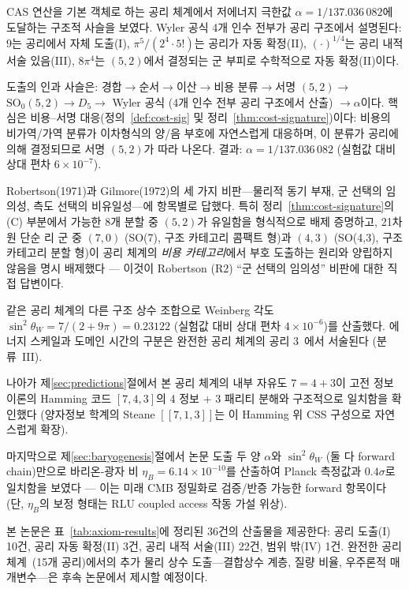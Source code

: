 \documentclass[entropy,article,submit,pdftex,oneauthor]{Definitions/mdpi}
\begin{document}
CAS 연산을 기본 객체로 하는 공리 체계에서 저에너지 극한값 $\alpha = 1/137.036\,082$에 도달하는 구조적 사슬을 보였다. Wyler 공식 4개 인수 전부가 공리 구조에서 설명된다: $9$는 공리에서 자체 도출(I), $\pi^5/(2^4 \cdot 5!)$는 공리가 자동 확정(II), $(\cdot)^{1/4}$는 공리 내적 서술 있음(III), $8\pi^4$는 $(5,2)$에서 결정되는 군 부피로 수학적으로 자동 확정(II)이다.

도출의 인과 사슬은: 경합$\to$순서$\to$이산$\to$비용 분류$\to$서명 $(5,2)$$\to$$\mathrm{SO}_0(5,2) \to D_5 \to$ Wyler 공식 (4개 인수 전부 공리 구조에서 산출) $\to \alpha$이다. 핵심은 비용--서명 대응(정의~\ref{def:cost-sig} 및 정리~\ref{thm:cost-signature})이다: 비용의 비가역/가역 분류가 이차형식의 양/음 부호에 자연스럽게 대응하며, 이 분류가 공리에 의해 결정되므로 서명 $(5,2)$가 따라 나온다. 결과: $\alpha = 1/137.036\,082$ (실험값 대비 상대 편차 $6 \times 10^{-7}$).

Robertson(1971)과 Gilmore(1972)의 세 가지 비판---물리적 동기 부재, 군 선택의 임의성, 측도 선택의 비유일성---에 항목별로 답했다. 특히 정리~\ref{thm:cost-signature}의 (C) 부분에서 가능한 8개 분할 중 $(5,2)$가 유일함을 형식적으로 배제 증명하고, 21차원 단순 리 군 중 $(7,0)$ (SO(7), 구조 카테고리 콤팩트 형)과 $(4,3)$ (SO(4,3), 구조 카테고리 분할 형)이 공리 체계의 \emph{비용 카테고리}에서 부호 도출하는 원리와 양립하지 않음을 명시 배제했다 — 이것이 Robertson (R2) ``군 선택의 임의성'' 비판에 대한 직접 답변이다.

같은 공리 체계의 다른 구조 상수 조합으로 Weinberg 각도 $\sin^2\theta_W = 7/(2+9\pi) = 0.23122$ (실험값 대비 상대 편차 $4 \times 10^{-6}$)를 산출했다. 에너지 스케일과 도메인 시간의 구분은 완전한 공리 체계의 공리 3~\cite{han2026}에서 서술된다 (분류~III).

나아가 제\ref{sec:predictions}절에서 본 공리 체계의 내부 자유도 $7 = 4 + 3$이 고전 정보이론의 Hamming 코드 $[7,4,3]$의 4 정보 + 3 패리티 분해와 구조적으로 일치함을 확인했다 (양자정보 학계의 Steane $[[7,1,3]]$는 이 Hamming 위 CSS 구성으로 자연스럽게 확장).

마지막으로 제\ref{sec:baryogenesis}절에서 논문 도출 두 양 $\alpha$와 $\sin^2\theta_W$ (둘 다 forward chain)만으로 바리온-광자 비 $\eta_B = 6.14 \times 10^{-10}$를 산출하여 Planck 측정값과 $0.4\sigma$로 일치함을 보였다 — 이는 미래 CMB 정밀화로 검증/반증 가능한 forward 항목이다 (단, $\eta_B$의 보정 형태는 RLU coupled access 작동 가설 위상).

본 논문은 표~\ref{tab:axiom-results}에 정리된 36건의 산출물을 제공한다: 공리 도출(I) 10건, 공리 자동 확정(II) 3건, 공리 내적 서술(III) 22건, 범위 밖(IV) 1건. 완전한 공리 체계~\cite{han2026}(15개 공리)에서의 추가 물리 상수 도출---결합상수 계층, 질량 비율, 우주론적 매개변수---은 후속 논문에서 제시할 예정이다.
\end{document}
